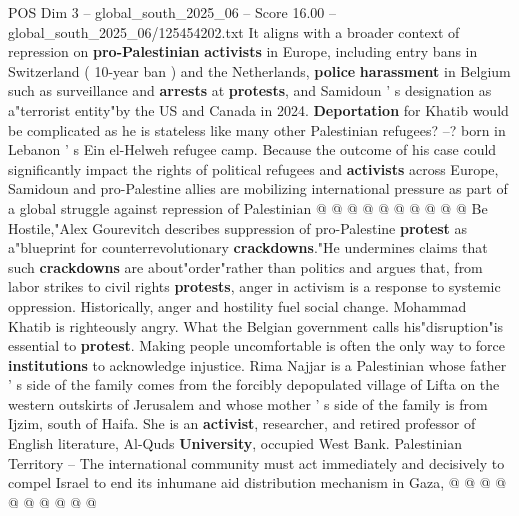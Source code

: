 \begin{textsample}{POS Dim 3 – global\_south\_2025\_06 – Score 16.00 – global\_south\_2025\_06/125454202.txt}
It aligns with a broader context of repression on \textbf{pro-Palestinian} \textbf{activists} in Europe, including entry bans in Switzerland ( 10-year ban ) and the Netherlands, \textbf{police} \textbf{harassment} in Belgium such as surveillance and \textbf{arrests} at \textbf{protests}, and Samidoun ' s designation as a"terrorist entity"by the US and Canada in 2024. \textbf{Deportation} for Khatib would be complicated as he is stateless like many other Palestinian refugees? --? born in Lebanon ' s Ein el-Helweh refugee camp.
Because the outcome of his case could significantly impact the rights of political refugees and \textbf{activists} across Europe, Samidoun and pro-Palestine allies are mobilizing international pressure as part of a global struggle against repression of Palestinian @ @ @ @ @ @ @ @ @ @ Be Hostile,"Alex Gourevitch describes suppression of pro-Palestine \textbf{protest} as a"blueprint for counterrevolutionary \textbf{crackdowns}."He undermines claims that such \textbf{crackdowns} are about"order"rather than politics and argues that, from labor strikes to civil rights \textbf{protests}, anger in activism is a response to systemic oppression.
Historically, anger and hostility fuel social change.
Mohammad Khatib is righteously angry.
What the Belgian government calls his"disruption"is essential to \textbf{protest}.
Making people uncomfortable is often the only way to force \textbf{institutions} to acknowledge injustice.
Rima Najjar is a Palestinian whose father ' s side of the family comes from the forcibly depopulated village of Lifta on the western outskirts of Jerusalem and whose mother ' s side of the family is from Ijzim, south of Haifa.
She is an \textbf{activist}, researcher, and retired professor of English literature, Al-Quds \textbf{University}, occupied West Bank.
Palestinian Territory -- The international community must act immediately and decisively to compel Israel to end its inhumane aid distribution mechanism in Gaza, @ @ @ @ @ @ @ @ @ @

\end{textsample}
